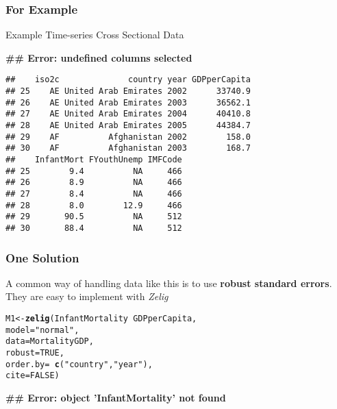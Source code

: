 \documentclass{beamer}\usepackage{graphicx, color}
\makeatletter
\newcommand{\hlfunctioncall}[1]{\textcolor[rgb]{0.501960784313725,0,0.329411764705882}{\textbf{#1}}}%
\newcommand{\hlstring}[1]{\textcolor[rgb]{0.6,0.6,1}{#1}}%
\newenvironment{kframe}{%
 \def\at@end@of@kframe{}%
 \ifinner\ifhmode%
  \def\at@end@of@kframe{\end{minipage}}%
  \begin{minipage}{\columnwidth}%
 \fi\fi%
 \def\FrameCommand##1{\hskip\@totalleftmargin \hskip-\fboxsep
 \colorbox{shadecolor}{##1}\hskip-\fboxsep
     \hskip-\linewidth \hskip-\@totalleftmargin \hskip\columnwidth}%
 \MakeFramed {\advance\hsize-\width
   \@totalleftmargin\z@ \linewidth\hsize
   \@setminipage}}%
 {\par\unskip\endMakeFramed%
 \at@end@of@kframe}
\newenvironment{knitrout}{}{} %
\makeatother
\begin{document}
\begin{frame}[fragile]
  \frametitle{For Example}
  {\LARGE{Example Time-series Cross Sectional Data}}
\begin{knitrout}
\color{fgcolor}\begin{kframe}


{\ttfamily\noindent\bfseries\textcolor{errorcolor}{\#\# Error: undefined columns selected}}\begin{verbatim}
##    iso2c              country year GDPperCapita
## 25    AE United Arab Emirates 2002      33740.9
## 26    AE United Arab Emirates 2003      36562.1
## 27    AE United Arab Emirates 2004      40410.8
## 28    AE United Arab Emirates 2005      44384.7
## 29    AF          Afghanistan 2002        158.0
## 30    AF          Afghanistan 2003        168.7
##    InfantMort FYouthUnemp IMFCode
## 25        9.4          NA     466
## 26        8.9          NA     466
## 27        8.4          NA     466
## 28        8.0        12.9     466
## 29       90.5          NA     512
## 30       88.4          NA     512
\end{verbatim}
\end{kframe}
\end{knitrout}

\end{frame}

\begin{frame}[fragile]
  \frametitle{One Solution}
  A common way of handling data like this is to use \textbf{robust standard errors}. \\[0.5cm]
  They are easy to implement with \emph{Zelig}


\begin{knitrout}
\color{fgcolor}\begin{kframe}
\begin{alltt}
M1 <- \hlfunctioncall{zelig}(InfantMortality ~ GDPperCapita, 
            model = \hlstring{"normal"},
            data = MortalityGDP,
            robust = TRUE, 
            order.by = ~\hlfunctioncall{c}(\hlstring{"country"}, \hlstring{"year"}),
            cite = FALSE)
\end{alltt}


{\ttfamily\noindent\bfseries\textcolor{errorcolor}{\#\# Error: object 'InfantMortality' not found}}\end{kframe}
\end{knitrout}

\end{frame}
\end{document}
